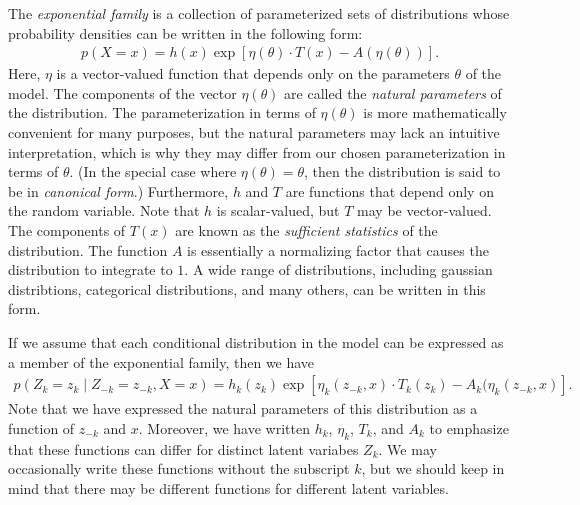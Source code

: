 \documentclass[11pt]{article}
\begin{document}
The \emph{exponential family} is a collection of parameterized sets of distributions whose probability densities can be written in the following form:
\begin{align}
p(X = x) = h(x) \exp\left[ \eta(\theta) \cdot T(x) - A(\eta(\theta)) \right].
\end{align}
Here, $\eta$ is a vector-valued function that depends only on the parameters $\theta$ of the model.
The components of the vector $\eta(\theta)$ are called the \emph{natural parameters} of the distribution.
The parameterization in terms of $\eta(\theta)$ is more mathematically convenient for many purposes, but the natural parameters may lack an intuitive interpretation, which is why they may differ from our chosen parameterization in terms of $\theta$.
(In the special case where $\eta(\theta) = \theta$, then the distribution is said to be in \emph{canonical form}.)
Furthermore, $h$ and $T$ are functions that depend only on the random variable.
Note that $h$ is scalar-valued, but $T$ may be vector-valued.
The components of $T(x)$ are known as the \emph{sufficient statistics} of the distribution.
The function $A$ is essentially a normalizing factor that causes the distribution to integrate to $1$.
A wide range of distributions, including gaussian distribtions, categorical distributions, and many others, can be written in this form.

If we assume that each conditional distribution in the model can be expressed as a member of the exponential family, then we have
\begin{align}
p(Z_k = z_k \mid Z_{-k} = z_{-k}, X = x) = h_k(z_k) \exp\left[ \eta_k(z_{-k}, x) \cdot T_k(z_k) - A_k(\eta_k(z_{-k}, x) \right].
\end{align}
Note that we have expressed the natural parameters of this distribution as a function of $z_{-k}$ and $x$.
Moreover, we have written $h_k$, $\eta_k$, $T_k$, and $A_k$ to emphasize that these functions can differ for distinct latent variabes $Z_k$.
We may occasionally write these functions without the subscript $k$, but we should keep in mind that there may be different functions for different latent variables.
\end{document}
